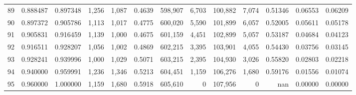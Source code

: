 \begin{tabular}{rrrrrrrrrrrrr}
89 &  0.888487 &  0.897348 &   1,256 &  1,087 &                                     0.4639 &  598,907 &    6,703 &  100,882 &    7,074 &  0.51346 &  0.06553 &  0.06209 \\
90 &  0.897372 &  0.905786 &   1,113 &  1,017 &                                     0.4775 &  600,020 &    5,590 &  101,899 &    6,057 &  0.52005 &  0.05611 &  0.05178 \\
91 &  0.905831 &  0.916459 &   1,139 &  1,000 &                                     0.4675 &  601,159 &    4,451 &  102,899 &    5,057 &  0.53187 &  0.04684 &  0.04123 \\
92 &  0.916511 &  0.928207 &   1,056 &  1,002 &                                     0.4869 &  602,215 &    3,395 &  103,901 &    4,055 &  0.54430 &  0.03756 &  0.03145 \\
93 &  0.928241 &  0.939996 &   1,000 &  1,029 &                                     0.5071 &  603,215 &    2,395 &  104,930 &    3,026 &  0.55820 &  0.02803 &  0.02218 \\
94 &  0.940000 &  0.959991 &   1,236 &  1,346 &                                     0.5213 &  604,451 &    1,159 &  106,276 &    1,680 &  0.59176 &  0.01556 &  0.01074 \\
95 &  0.960000 &  1.000000 &   1,159 &  1,680 &                                     0.5918 &  605,610 &        0 &  107,956 &        0 &      nan &  0.00000 &  0.00000 \\
\bottomrule
\end{tabular}
